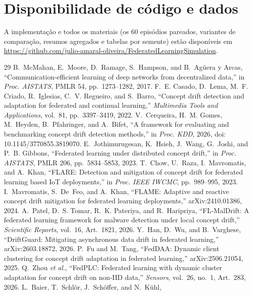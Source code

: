 \documentclass[conference]{IEEEtran}
\begin{document}
\section*{Disponibilidade de código e dados}
A implementação e todos os materiais (os 60 episódios pareados, variantes de comparação, resumos agregados e tabelas por semente) estão disponíveis em \url{https://github.com/julio-amaral-oliveira/FederatedLearningSimulation}.
\begin{thebibliography}{29}
 B.~McMahan, E.~Moore, D.~Ramage, S.~Hampson, and
B.~Ag{\"u}era y Arcas, ``Communication-efficient learning of deep networks
from decentralized data,'' in \emph{Proc. AISTATS}, PMLR 54,
pp.~1273--1282, 2017.
 F.~E. Casado, D.~Lema, M.~F. Criado, R.~Iglesias,
C.~V. Regueiro, and S.~Barro, ``Concept drift detection and adaptation for
federated and continual learning,'' \emph{Multimedia Tools and
Applications}, vol.~81, pp.~3397--3419, 2022.
 V.~Cerqueira, H.~M. Gomes, M.~Heyden,
B.~Pfahringer, and A.~Bifet, ``A framework for evaluating and benchmarking
concept drift detection methods,'' in \emph{Proc. KDD}, 2026,
doi: 10.1145/3770855.3819070.
 E.~Jothimurugesan, K.~Hsieh, J.~Wang,
G.~Joshi, and P.~B. Gibbons, ``Federated learning under distributed concept
drift,'' in \emph{Proc. AISTATS}, PMLR 206, pp.~5834--5853, 2023.
 T.~Chow, U.~Raza, I.~Mavromatis, and A.~Khan, ``FLARE:
Detection and mitigation of concept drift for federated learning based IoT
deployments,'' in \emph{Proc. IEEE IWCMC}, pp.~989--995, 2023.
 I.~Mavromatis, S.~De~Feo, and A.~Khan, ``FLAME:
Adaptive and reactive concept drift mitigation for federated learning
deployments,'' arXiv:2410.01386, 2024.
 A.~Patel, D.~S. Tomar, R.~K. Pateriya, and
R.~Haripriya, ``FL-MalDrift: A federated learning framework for malware
detection under local concept drift,'' \emph{Scientific Reports},
vol.~16, Art.~1821, 2026.
 Y.~Han, D.~Wu, and B.~Varghese, ``DriftGuard: Mitigating
asynchronous data drift in federated learning,'' arXiv:2603.18872, 2026.
 P.~Fu and M.~Tang, ``FedDAA: Dynamic client clustering for
concept drift adaptation in federated learning,'' arXiv:2506.21054, 2025.
 Q.~Zhou \emph{et al.}, ``FedPLC: Federated learning with
dynamic cluster adaptation for concept drift on non-IID data,''
\emph{Sensors}, vol.~26, no.~1, Art.~283, 2026.
 L.~Baier, T.~Schl{\"o}r, J.~Sch{\"o}ffer, and N.~K{\"u}hl,

\end{thebibliography}
\end{document}
